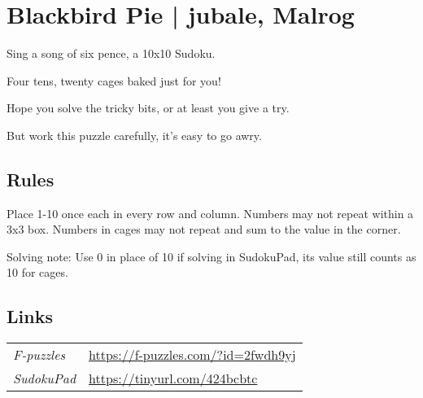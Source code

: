 \section[Blackbird Pie | jubale, Malrog {[\emph{10\emph{x}10 Latin Square, Deficit, Killer Cages}]}]{Blackbird Pie | {\normalfont jubale, Malrog}}
\label{sec:09-blackbird-pie-jubale-malrog}
Sing a song of six pence, a 10x10 Sudoku.

Four tens, twenty cages baked just for you!

Hope you solve the tricky bits, or at least you give a try.

But work this puzzle carefully, it’s easy to go awry.
\subsection*{Rules}
\begin{markdown}
Place 1-10 once each in every row and column.  Numbers may not repeat within a 3x3 box.  Numbers in cages may not repeat and sum to the value in the corner.

Solving note: Use 0 in place of 10 if solving in SudokuPad, its value still counts as 10 for cages.
\end{markdown}
\subsection*{Links}
\begin{tabularx}{\textwidth}{l X}
\emph{F-puzzles} & \url{https://f-puzzles.com/?id=2fwdh9yj} \\
\emph{SudokuPad} & \url{https://tinyurl.com/424bcbtc} \\
\end{tabularx}
\pagebreak
